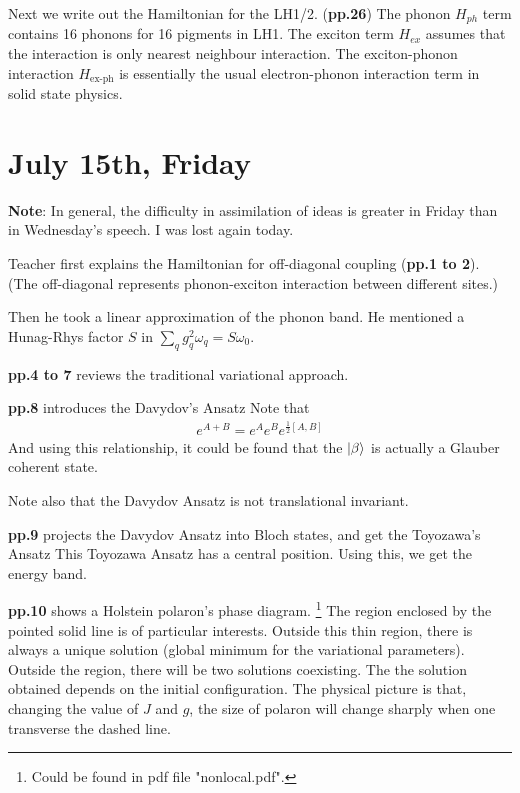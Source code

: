 \documentclass{article}
\numberwithin{equation}{subsection} %
\theoremstyle{definition}
\begin{document}
Next we write out the Hamiltonian for the LH1/2. (\textbf{pp.26})
The phonon $H_{ph}$ term 
contains 16 phonons for 16 pigments in LH1. The exciton term $H_{ex}$
assumes that the interaction is only nearest neighbour interaction.
The exciton-phonon interaction $H_{\text{ex-ph}}$ is essentially
the usual electron-phonon interaction term in solid state physics.
\section{July 15th, Friday}
\label{sec:July_15}

\textbf{Note}: In general, the difficulty in assimilation of ideas is
greater in Friday than in Wednesday's speech. I was lost again today. 

Teacher first explains the Hamiltonian for off-diagonal coupling
(\textbf{pp.1 to 2}). (The off-diagonal represents phonon-exciton
interaction between different sites.)

Then he took a linear approximation of the phonon band. He mentioned
a Hunag-Rhys factor $S$ in $\sum_q g_q^2 \omega_q = S\omega_0$.

\textbf{pp.4 to 7} reviews the traditional variational approach.

\textbf{pp.8} introduces the Davydov's Ansatz
Note that
\begin{align*}
    e^{A+B} = e^A e^B e^{\frac{1}{2}[A,B]}
\end{align*}
And using this relationship, it could be found that the $\ket{\beta}$
is actually a Glauber coherent state.

Note also that the Davydov Ansatz is not translational invariant. 

\textbf{pp.9} projects the Davydov Ansatz into Bloch states, and get
the Toyozawa's Ansatz This Toyozawa Ansatz has a central
position. Using this, we get the energy band.

\textbf{pp.10 }shows a Holstein polaron's phase diagram. 
\footnote{Could be found in pdf file "nonlocal.pdf".}
The region enclosed by the pointed solid line is of particular
interests. Outside this thin region,
there is always a unique solution (global minimum for the variational
parameters). 
Outside the region, there will be two solutions coexisting.
The the solution obtained depends on the initial configuration.
The physical picture is that, changing the value of $J$ and $g$,
the size of polaron will change sharply when one transverse the
dashed line.
\end{document}
